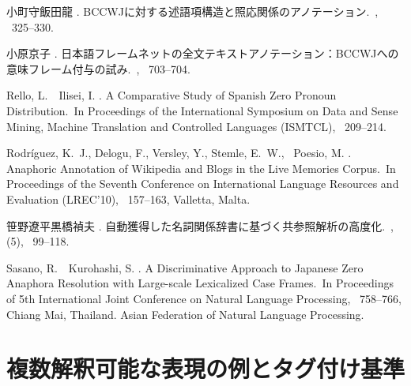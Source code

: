 \documentclass[japanese]{jnlp_1.4}
\begin{document}
\begin{thebibliography}{}
小町守\JBA 飯田龍 \BBCP.
\newblock BCCWJに対する述語項構造と照応関係のアノテーション.\
\newblock {}, \mbox{\BPGS\
  325--330}.

小原京子 \BBCP.
\newblock
  日本語フレームネットの全文テキストアノテーション：BCCWJへの意味フレーム付与の試み.\
\newblock {}, \mbox{\BPGS\ 703--704}.

Rello, L.\BBACOMMA\ \BBA\ Ilisei, I. \BBOP 2009\BBCP.
\newblock \BBOQ A Comparative Study of Spanish Zero Pronoun Distribution.\BBCQ\
\newblock In {\Bem Proceedings of the International Symposium on Data and Sense
  Mining, Machine Translation and Controlled Languages (ISMTCL)}, \mbox{\BPGS\
  209--214}.

Rodr\'iguez, K.~J., Delogu, F., Versley, Y., Stemle, E.~W., \BBA\ Poesio, M.
  \BBOP 2010\BBCP.
\newblock \BBOQ Anaphoric Annotation of Wikipedia and Blogs in the Live
  Memories Corpus.\BBCQ\
\newblock In {\Bem Proceedings of the Seventh Conference on International
  Language Resources and Evaluation (LREC'10)}, \mbox{\BPGS\ 157--163},
  Valletta, Malta.

笹野遼平\JBA 黒橋禎夫 \BBOP 2008\BBCP.
\newblock 自動獲得した名詞関係辞書に基づく共参照解析の高度化.\
\newblock {}, {}  (5), \mbox{\BPGS\ 99--118}.

Sasano, R.\BBACOMMA\ \BBA\ Kurohashi, S. \BBCP.
\newblock \BBOQ A Discriminative Approach to Japanese Zero Anaphora Resolution
  with Large-scale Lexicalized Case Frames.\BBCQ\
\newblock In {\Bem Proceedings of 5th International Joint Conference on Natural
  Language Processing}, \mbox{\BPGS\ 758--766}, Chiang Mai, Thailand. Asian
  Federation of Natural Language Processing.

\end{thebibliography}


\appendix

\section{複数解釈可能な表現の例とタグ付け基準}\label{付録:複数付与基準}
\end{document}
